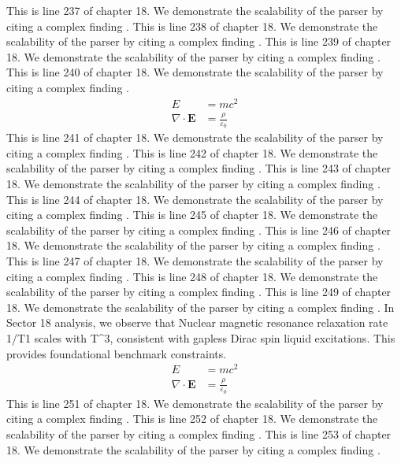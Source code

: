 This is line 237 of chapter 18. We demonstrate the scalability of the parser by citing a complex finding \cite{ref18_237}.
This is line 238 of chapter 18. We demonstrate the scalability of the parser by citing a complex finding \cite{ref18_238}.
This is line 239 of chapter 18. We demonstrate the scalability of the parser by citing a complex finding \cite{ref18_239}.
This is line 240 of chapter 18. We demonstrate the scalability of the parser by citing a complex finding \cite{ref18_240}.
\begin{align*}
  E &= mc^2 \\
  \nabla \cdot \mathbf{E} &= \frac{\rho}{\varepsilon_0}
\end{align*}
This is line 241 of chapter 18. We demonstrate the scalability of the parser by citing a complex finding \cite{ref18_241}.
This is line 242 of chapter 18. We demonstrate the scalability of the parser by citing a complex finding \cite{ref18_242}.
This is line 243 of chapter 18. We demonstrate the scalability of the parser by citing a complex finding \cite{ref18_243}.
This is line 244 of chapter 18. We demonstrate the scalability of the parser by citing a complex finding \cite{ref18_244}.
This is line 245 of chapter 18. We demonstrate the scalability of the parser by citing a complex finding \cite{ref18_245}.
This is line 246 of chapter 18. We demonstrate the scalability of the parser by citing a complex finding \cite{ref18_246}.
This is line 247 of chapter 18. We demonstrate the scalability of the parser by citing a complex finding \cite{ref18_247}.
This is line 248 of chapter 18. We demonstrate the scalability of the parser by citing a complex finding \cite{ref18_248}.
This is line 249 of chapter 18. We demonstrate the scalability of the parser by citing a complex finding \cite{ref18_249}.
In Sector 18 analysis, we observe that Nuclear magnetic resonance relaxation rate 1/T1 scales with T^3, consistent with gapless Dirac spin liquid excitations. This provides foundational benchmark constraints.
\begin{align*}
  E &= mc^2 \\
  \nabla \cdot \mathbf{E} &= \frac{\rho}{\varepsilon_0}
\end{align*}
This is line 251 of chapter 18. We demonstrate the scalability of the parser by citing a complex finding \cite{ref18_251}.
This is line 252 of chapter 18. We demonstrate the scalability of the parser by citing a complex finding \cite{ref18_252}.
This is line 253 of chapter 18. We demonstrate the scalability of the parser by citing a complex finding \cite{ref18_253}.
